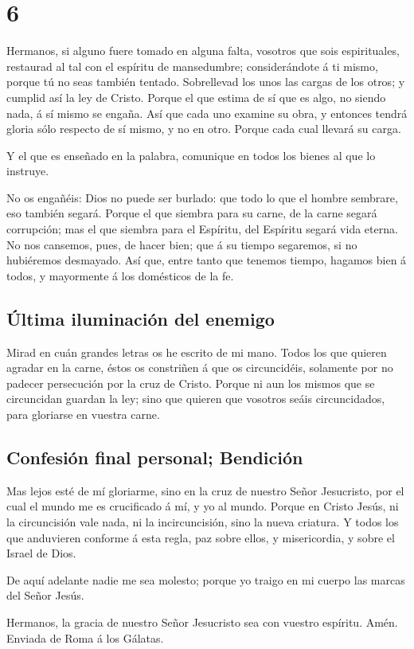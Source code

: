 \hypertarget{section-5}{%
\section{6}\label{section-5}}

 Hermanos, si alguno fuere tomado en alguna falta, vosotros
que sois espirituales, restaurad al tal con el espíritu de mansedumbre;
considerándote á ti mismo, porque tú no seas también tentado.
 Sobrellevad los unos las cargas de los otros; y cumplid así
la ley de Cristo.  Porque el que estima de sí que es algo,
no siendo nada, á sí mismo se engaña.  Así que cada uno
examine su obra, y entonces tendrá gloria sólo respecto de sí mismo, y
no en otro.  Porque cada cual llevará su carga.

 Y el que es enseñado en la palabra, comunique en todos los
bienes al que lo instruye.

 No os engañéis: Dios no puede ser burlado: que todo lo que
el hombre sembrare, eso también segará.  Porque el que
siembra para su carne, de la carne segará corrupción; mas el que siembra
para el Espíritu, del Espíritu segará vida eterna.  No nos
cansemos, pues, de hacer bien; que á su tiempo segaremos, si no
hubiéremos desmayado.  Así que, entre tanto que tenemos
tiempo, hagamos bien á todos, y mayormente á los domésticos de la fe.

\hypertarget{uxfaltima-iluminaciuxf3n-del-enemigo}{%
\subsection{Última iluminación del
enemigo}\label{uxfaltima-iluminaciuxf3n-del-enemigo}}

 Mirad en cuán grandes letras os he escrito de mi mano.
 Todos los que quieren agradar en la carne, éstos os
constriñen á que os circuncidéis, solamente por no padecer persecución
por la cruz de Cristo.  Porque ni aun los mismos que se
circuncidan guardan la ley; sino que quieren que vosotros seáis
circuncidados, para gloriarse en vuestra carne.

\hypertarget{confesiuxf3n-final-personal-bendiciuxf3n}{%
\subsection{Confesión final personal;
Bendición}\label{confesiuxf3n-final-personal-bendiciuxf3n}}

 Mas lejos esté de mí gloriarme, sino en la cruz de nuestro
Señor Jesucristo, por el cual el mundo me es crucificado á mí, y yo al
mundo.  Porque en Cristo Jesús, ni la circuncisión vale
nada, ni la incircuncisión, sino la nueva criatura.  Y
todos los que anduvieren conforme á esta regla, paz sobre ellos, y
misericordia, y sobre el Israel de Dios.

 De aquí adelante nadie me sea molesto; porque yo traigo en
mi cuerpo las marcas del Señor Jesús.

 Hermanos, la gracia de nuestro Señor Jesucristo sea con
vuestro espíritu. Amén. Enviada de Roma á los Gálatas.
